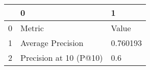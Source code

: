 \begin{tabular}{lll}
\toprule
{} &                       0 &         1 \\
\midrule
0 &                  Metric &     Value \\
1 &       Average Precision &  0.760193 \\
2 &  Precision at 10 (P@10) &       0.6 \\
\bottomrule
\end{tabular}
